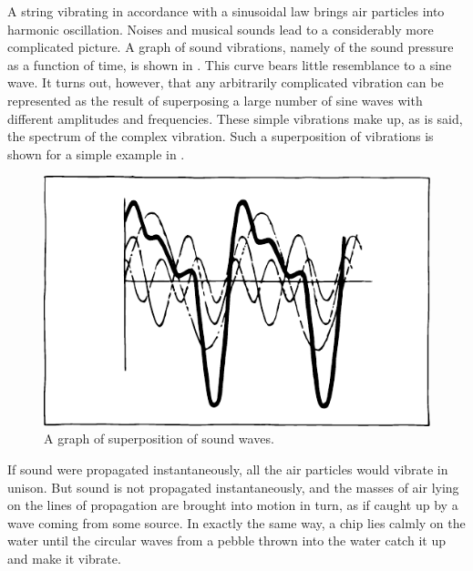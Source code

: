 A string vibrating in accordance with a sinusoidal law brings air particles into harmonic oscillation. Noises and musical sounds lead to a considerably more complicated picture. A graph of sound vibrations, namely of the sound pressure as a function of time, is shown in . This curve bears little resemblance to a sine wave. It turns out, however, that any arbitrarily complicated vibration can be represented as the result of superposing a large number of sine waves with different amplitudes and frequencies. These simple vibrations make up, as is said, the spectrum of the complex vibration. Such a su­perposition of vibrations is shown for a simple example in .
\begin{figure}[!ht]
\centering
\includegraphics[width=\textwidth]{figures/fig-06-10.pdf}
\caption{A graph of superposition of sound waves.}
\label{fig-6.10}
\end{figure}

If sound were propagated instantaneously, all the air particles would vibrate in unison. But sound is not prop­agated instantaneously, and the masses of air lying on the lines of propagation are brought into motion in turn, as if caught up by a wave coming from some source. In exactly the same way, a chip lies calmly on the water until the circular waves from a pebble thrown into the water catch it up and make it vibrate.

